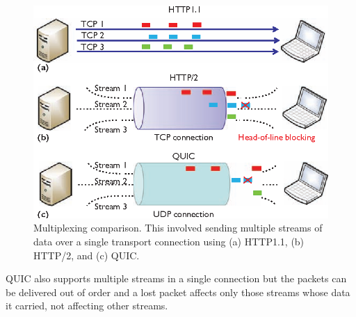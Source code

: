\begin{frame}
    \begin{figure}[!ht]
        \centering
        \includegraphics[width=1\textwidth]
        {figures/hol.png}
        \endminipage\hfill
        \caption{\label{fig:hol}Multiplexing comparison. This involved sending multiple streams of data over a single transport connection using (a) HTTP1.1, (b) HTTP/2, and (c) QUIC.\cite{Cui2017}}
    \end{figure}

QUIC also supports multiple streams in a single connection but the packets can be delivered out of order and a lost packet affects only those streams whose data it carried, not affecting other streams.


\end{frame}
\clearpage

